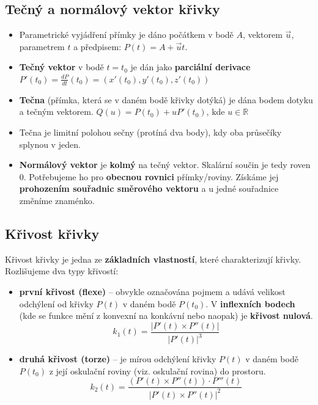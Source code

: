 \subsection{Tečný a normálový vektor křivky}
\begin{itemize}
	\item Parametrické vyjádření přímky je dáno počátkem v bodě $ A $, vektorem $ \vec{u} $, parametrem $ t $ a předpisem: $P(t) = A + \vec{u}t.$
	\item \textbf{Tečný vektor} v bodě $t=t_0$ je dán jako \textbf{parciální derivace} $P'(t_0) = \frac{dP}{dt}(t_0) = (x'(t_0), y'(t_0), z'(t_0))$
	\item \textbf{Tečna} (přímka, která se v daném bodě křivky dotýká) je dána bodem dotyku a tečným vektorem. $Q(u) = P(t_0) + uP'(t_0)$, kde $u \in \mathbb{R}$
	\item Tečna je limitní polohou sečny (protíná dva body), kdy oba průsečíky splynou v jeden.
\end{itemize}
\begin{itemize}
	\item \textbf{Normálový vektor} je \textbf{kolmý} na tečný vektor. Skalární součin je tedy roven 0. Potřebujeme ho pro \textbf{obecnou rovnici} přímky/roviny. Získáme jej \textbf{prohozením souřadnic směrového vektoru} a u jedné souřadnice změníme znaménko.
\end{itemize}

\subsection{Křivost křivky}
Křivost křivky je jedna ze \textbf{základních vlastností}, které charakterizují křivky. Rozlišujeme dva typy křivostí:
\begin{itemize}
	\item \textbf{první křivost (flexe)} -- obvykle označována pojmem  a udává velikost odchýlení od křivky $P(t)$ v daném bodě $P(t_0)$. V \textbf{inflexních bodech} (kde se funkce mění z konvexní na konkávní nebo naopak) je \textbf{křivost nulová}.
		\begin{equation*}
				k_1(t) = \frac{|P'(t) \times P''(t)|}{|P'(t)|^3}
	\end{equation*}
	\item \textbf{druhá křivost (torze)} -- je mírou odchýlení křivky $P(t)$ v daném bodě $P(t_0)$ z její oskulační roviny (viz. oskulační rovina) do prostoru.
	\begin{equation*}
				k_2(t) = \frac{(P'(t) \times P''(t)) \cdot P'''(t)}{|P'(t) \times P''(t)|^2}
	\end{equation*}
\end{itemize}
